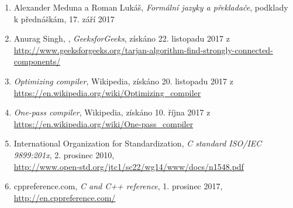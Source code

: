 \renewcommand\labelenumi{[\arabic{enumi}]}
\renewcommand\theenumi\labelenumi
\begin{enumerate}
	\item Alexander Meduna a Roman Lukáš, \emph{Formální jazyky a
překladače}, podklady k přednáškám, 17. září 2017

	\item Anurag Singh, , \emph{GeeksforGeeks}, získáno 22. listopadu 2017 z \href{http://www.geeksforgeeks.org/tarjan-algorithm-find-strongly-connected-components/}{http://www.geeksforgeeks.org/tarjan-algorithm-find-strongly-connected-components/}

	\item \emph{Optimizing compiler}, Wikipedia, získáno 20. listopadu 2017 z \href{https://en.wikipedia.org/wiki/Optimizing\_compiler}{https://en.wikipedia.org/wiki/Optimizing\_compiler}

	\item \emph{One-pass compiler}, Wikipedia, získáno 10. října 2017 z \href{https://en.wikipedia.org/wiki/One-pass\_compiler}{https://en.wikipedia.org/wiki/One-pass\_compiler}

	\item International Organization for Standardization, \emph{C standard ISO/IEC 9899:201x}, 2. prosinec 2010, \\\href{http://www.open-std.org/jtc1/sc22/wg14/www/docs/n1548.pdf}{http://www.open-std.org/jtc1/sc22/wg14/www/docs/n1548.pdf}

	\item cppreference.com, \emph{C and C++ reference}, 1. prosinec 2017, \href{http://en.cppreference.com/}{http://en.cppreference.com/}
\end{enumerate}

